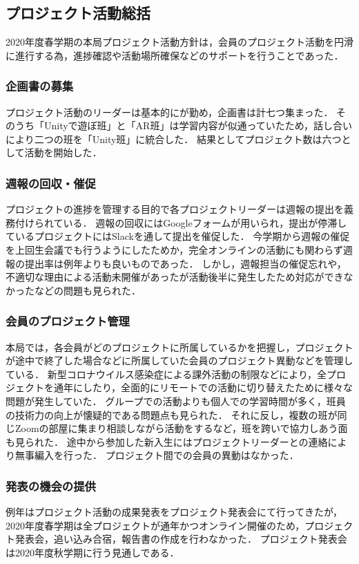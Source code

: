 \subsection*{プロジェクト活動総括}


2020年度春学期の本局プロジェクト活動方針は，会員のプロジェクト活動を円滑に進行する為，進捗確認や活動場所確保などのサポートを行うことであった．

\subsubsection*{企画書の募集}

プロジェクト活動のリーダーは基本的に\secondGrade{}が勤め，企画書は計七つ集まった．
そのうち「Unityで遊ぼ班」と「AR班」は学習内容が似通っていたため，話し合いにより二つの班を「Unity班」に統合した．
結果としてプロジェクト数は六つとして活動を開始した．

\subsubsection*{週報の回収・催促}

プロジェクトの進捗を管理する目的で各プロジェクトリーダーは週報の提出を義務付けられている．
週報の回収にはGoogleフォームが用いられ，提出が停滞しているプロジェクトにはSlackを通して提出を催促した．
今学期から週報の催促を上回生会議でも行うようにしたためか，完全オンラインの活動にも関わらず週報の提出率は例年よりも良いものであった．
しかし，週報担当の催促忘れや，不適切な理由による活動未開催があったが活動後半に発生したため対応ができなかったなどの問題も見られた．

\subsubsection*{会員のプロジェクト管理}

本局では，各会員がどのプロジェクトに所属しているかを把握し，プロジェクトが途中で終了した場合などに所属していた会員のプロジェクト異動などを管理している．
新型コロナウイルス感染症による課外活動の制限などにより，全プロジェクトを通年にしたり，全面的にリモートでの活動に切り替えたために様々な問題が発生していた．
グループでの活動よりも個人での学習時間が多く，班員の技術力の向上が懐疑的である問題点も見られた．
それに反し，複数の班が同じZoomの部屋に集まり相談しながら活動をするなど，班を跨いで協力しあう面も見られた．
途中から参加した新入生にはプロジェクトリーダーとの連絡により無事編入を行った．
プロジェクト間での会員の異動はなかった．

\subsubsection*{発表の機会の提供}

例年はプロジェクト活動の成果発表をプロジェクト発表会にて行ってきたが，2020年度春学期は全プロジェクトが通年かつオンライン開催のため，プロジェクト発表会，追い込み合宿，報告書の作成を行わなかった．
プロジェクト発表会は2020年度秋学期に行う見通しである．
